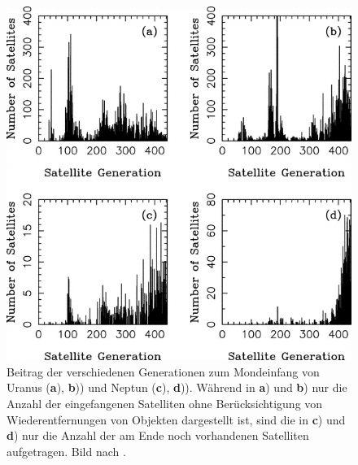 \documentclass[12pt,a4paper,twoside]{article}
\begin{document}
\begin{figure}[tbn]
\centering
\includegraphics[scale=0.4]{img/Nesvorny2007-8.png}
\caption{Beitrag der verschiedenen Generationen zum Mondeinfang von Uranus (\textbf{a}), \textbf{b})) und Neptun (\textbf{c}), \textbf{d})). Während in \textbf{a}) und \textbf{b}) nur die Anzahl der eingefangenen Satelliten ohne Berücksichtigung von Wiederentfernungen von Objekten dargestellt ist, sind die in  \textbf{c}) und \textbf{d}) nur die Anzahl der am Ende noch vorhandenen Satelliten aufgetragen. Bild nach \cite{Nesvorny2007}.} %
\label{fig:Mondgenerationen}
\end{figure}
\end{document}
